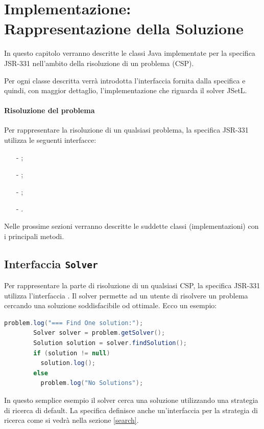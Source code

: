 
\chapter{Implementazione: Rappresentazione della Soluzione}\label{capImpl2}
In questo capitolo verranno descritte le classi Java implementate per la
specifica JSR-331 nell'ambito della risoluzione di un problema (CSP).

Per ogni classe descritta verrà introdotta l'interfaccia fornita dalla 
specifica e quindi, con maggior dettaglio, l'implementazione che riguarda
il solver JSetL.


\subsubsection{Risoluzione del problema}
Per rappresentare la risoluzione di un qualsiasi problema, la specifica JSR-331
utilizza le seguenti interfacce: 
\begin{itemize}
\item[-];
\item[-];
\item[-];
\item[-].
\end{itemize}
Nelle prossime sezioni verranno descritte le suddette classi (implementazioni)
con i principali metodi.


\section{Interfaccia \texttt{Solver}}\label{solver}
Per rappresentare la parte di risoluzione di un qualsiasi CSP, la specifica
JSR-331 utilizza l'interfaccia . Il solver permette ad un utente
di risolvere un problema cercando una soluzione soddisfacibile od ottimale. Ecco
un esempio:
\begin{lstlisting}[language = Java,
                   caption = {una risoluzione di \files{problem}.}]
        problem.log("=== Find One solution:");
        Solver solver = problem.getSolver();
        Solution solution = solver.findSolution();
        if (solution != null)
          solution.log();
        else
          problem.log("No Solutions");
\end{lstlisting}
In questo semplice esempio il solver cerca una soluzione 
utilizzando una strategia di ricerca di default. La specifica definisce anche 
un'interfaccia per la strategia di ricerca come si vedrà nella sezione
\ref{search}.

